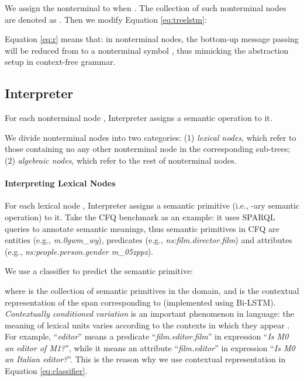\documentclass[11pt,a4paper]{article}
\begin{document}
We assign the nonterminal  to  when .
The collection of such nonterminal nodes are denoted as .
Then we modify Equation \ref{eq:treelstm}:


Equation \ref{eq:r} means that: in nonterminal nodes, the bottom-up message passing will be reduced from  to a nonterminal symbol , thus mimicking the abstraction setup in context-free grammar.











\subsection{Interpreter}







For each nonterminal node , Interpreter  assigns a semantic operation  to it.

We divide nonterminal nodes into two categories:
(1) \textit{lexical nodes}, which refer to those containing no any other nonterminal node in the corresponding sub-trees;
(2) \textit{algebraic nodes}, which refer to the rest of nonterminal nodes.

\paragraph{Interpreting Lexical Nodes}

For each lexical node , Interpreter assigns a semantic primitive (i.e., -ary semantic operation) to it.
Take the CFQ benchmark as an example:
it uses SPARQL queries to annotate semantic meanings, thus semantic primitives in CFQ are entities (e.g., \textit{m.0gwm\_wy}), predicates (e.g., \textit{ns:film.director.film}) and attributes (e.g., \textit{ns:people.person.gender m\_05zppz}).

We use a classifier to predict the semantic primitive:

where  is the collection of semantic primitives in the domain, and  is the contextual representation of the span corresponding to  (implemented using Bi-LSTM).
\textit{Contextually conditioned variation} is an important phenomenon in language: the meaning of lexical units varies according to the contexts in which they appear \cite{allwood2003meaning-ccv}.
For example, ``\emph{editor}'' means a predicate ``\emph{film.editor.film}'' in expression ``\emph{Is M0 an editor of M1?}'', while it means an attribute ``\emph{film.editor}'' in expression ``\emph{Is M0 an Italian editor?}''.
This is the reason why we use contextual representation in Equation \ref{eq:classifier}.
\end{document}
